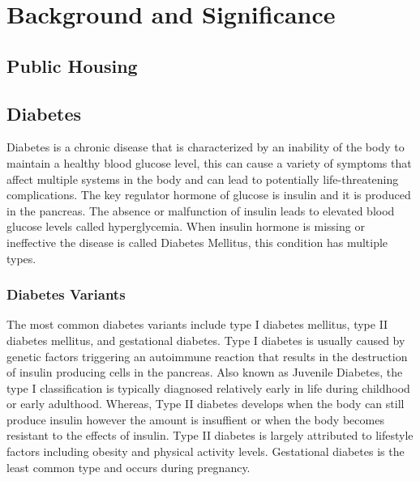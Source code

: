 \documentclass [11pt, proquest] {uwthesis}[2015/03/03]
\begin{document}
\titlepage
  \pagebreak


\copyrightpage

\setcounter{page}{-1}

\tableofcontents
\listoffigures
\listoftables



\textpages


\chapter{Background and Significance}\label{rmd-basics}

\section{Public Housing}\label{public-housing}

\section{Diabetes}\label{diabetes}

Diabetes is a chronic disease that is characterized by an inability of
the body to maintain a healthy blood glucose level, this can cause a
variety of symptoms that affect multiple systems in the body and can
lead to potentially life-threatening complications. The key regulator
hormone of glucose is insulin and it is produced in the pancreas. The
absence or malfunction of insulin leads to elevated blood glucose levels
called hyperglycemia. When insulin hormone is missing or ineffective the
disease is called Diabetes Mellitus, this condition has multiple types.

\subsection{Diabetes Variants}\label{diabetes-variants}

The most common diabetes variants include type I diabetes mellitus, type
II diabetes mellitus, and gestational diabetes. Type I diabetes is
usually caused by genetic factors triggering an autoimmune reaction that
results in the destruction of insulin producing cells in the pancreas.
Also known as Juvenile Diabetes, the type I classification is typically
diagnosed relatively early in life during childhood or early adulthood.
Whereas, Type II diabetes develops when the body can still produce
insulin however the amount is insuffient or when the body becomes
resistant to the effects of insulin. Type II diabetes is largely
attributed to lifestyle factors including obesity and physical activity
levels. Gestational diabetes is the least common type and occurs during
pregnancy.
\end{document}
